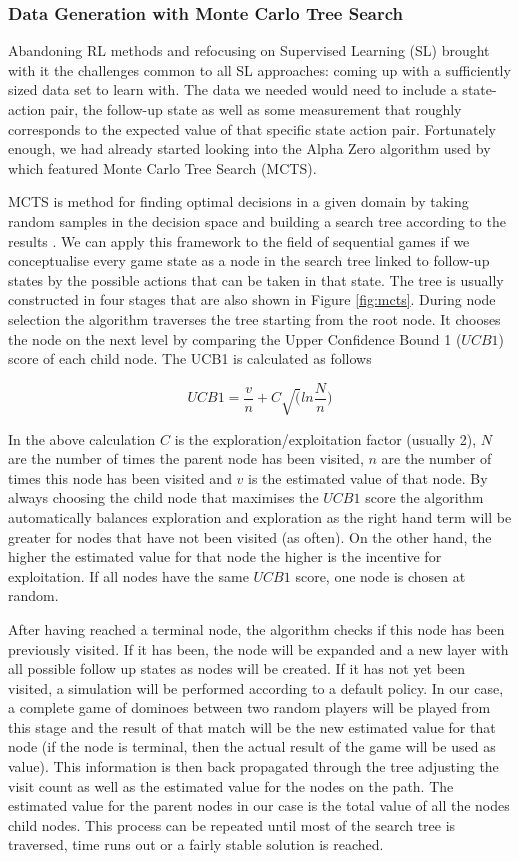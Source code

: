 \documentclass[12pt,a4paper]{article}
\begin{document}
\subsubsection{Data Generation with Monte Carlo Tree Search}
Abandoning RL methods and refocusing on Supervised Learning (SL) brought with it the challenges common to all SL approaches: coming up with a sufficiently sized data set to learn with. The data we needed would need to include a state-action pair, the follow-up state as well as some measurement that roughly corresponds to the expected value of that specific state action pair. Fortunately enough, we had already started looking into the Alpha Zero algorithm used by \citet{silver_mastering_2017} which featured Monte Carlo Tree Search (MCTS). 

MCTS is method  for finding  optimal  decisions  in  a  given  domain  by taking random samples in the decision space and building a search tree according to the results \citep{browne_survey_2012}. We can apply this framework to the field of sequential games if we conceptualise every game state as a node in the search tree linked to follow-up states by the possible actions that can be taken in that state. The tree is usually constructed in four stages that are also shown in Figure \ref{fig:mcts}. During node selection the algorithm traverses the tree starting from the root node. It chooses the node on the next level by comparing the Upper Confidence Bound 1 ($UCB1$) score of each child node. The UCB1 is calculated as follows

$$UCB1 = \frac{v}{n} + C \sqrt(ln \frac{N}{n})$$

In the above calculation $C$ is the exploration/exploitation factor (usually 2), $N$ are the number of times the parent node has been visited, $n$ are the number of times this node has been visited and $v$ is the estimated value of that node. By always choosing the child node that maximises the $UCB1$ score the algorithm automatically balances exploration and exploration as the right hand term will be greater for nodes that have not been visited (as often). On the other hand, the higher the estimated value for that node the higher is the incentive for exploitation. If all nodes have the same $UCB1$ score, one node is chosen at random. 

After having reached a terminal node, the algorithm checks if this node has been previously visited. If it has been, the node will be expanded and a new layer with all possible follow up states as nodes will be created. If it has not yet been visited, a simulation will be performed according to a default policy. In our case, a complete game of dominoes between two random players will be played from this stage and the result of that match will be the new estimated value for that node (if the node is terminal, then the actual result of the game will be used as value). This information is then back propagated through the tree adjusting the visit count as well as the estimated value for the nodes on the path. The estimated value for the parent nodes in our case is the total value of all the nodes child nodes. This process can be repeated until most of the search tree is traversed, time runs out or a fairly stable solution is reached.
\end{document}
